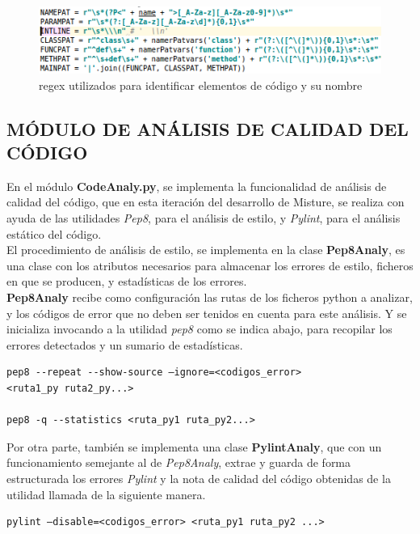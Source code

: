 \begin{figure}[H]
   \centering
   \includegraphics[width=16cm]{img/Selection_022_pyanaly_regex}
   \caption{regex utilizados para identificar elementos de código y su nombre}
   \label{figura:regex}
\end{figure}

\subsection{MÓDULO DE ANÁLISIS DE CALIDAD DEL CÓDIGO}

En el módulo \textbf{CodeAnaly.py}, se implementa la funcionalidad de análisis de calidad del código, que en esta iteración del desarrollo de Misture, se realiza con ayuda de las utilidades \textit{Pep8}, para el análisis de estilo, y \textit{Pylint}, para el análisis estático del código.\\


El procedimiento de análisis de estilo, se implementa en la clase \textbf{Pep8Analy}, es una clase con los atributos necesarios para almacenar los errores de estilo, ficheros en que se producen, y estadísticas de los errores.\\


\textbf{Pep8Analy}  recibe como configuración las rutas de los ficheros python a analizar, y los códigos de error que no deben ser tenidos en cuenta para este análisis. Y se inicializa invocando a la utilidad \textit{pep8} como se indica abajo, para recopilar los errores detectados y un sumario de estadísticas.

\begin{verbatim}
pep8 --repeat --show-source –ignore=<codigos_error>
<ruta1_py ruta2_py...>

pep8 -q --statistics <ruta_py1 ruta_py2...>
\end{verbatim}


Por otra parte, también se implementa una clase \textbf{PylintAnaly}, que con un funcionamiento semejante al de \textit{Pep8Analy}, extrae y guarda de forma estructurada los errores \textit{Pylint} y la nota de calidad del código obtenidas de la utilidad llamada de la siguiente manera.

\begin{verbatim}
pylint –disable=<codigos_error> <ruta_py1 ruta_py2 ...>
\end{verbatim}


